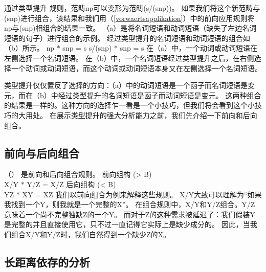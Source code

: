 通过类型提升
规则，范畴np可以变形为范畴(s/(s\bs np))。
如果我们将这个新范畴与(s\bs np)进行组合，该结果和我们用（\ref{vorwaertsapplikation}）中的前向应用规则将np与(s\bs np)相组合的结果一致。 
（a）是将名词短语和动词短语（缺失了左边名词短语的句子）进行组合的示例。
经过类型提升的名词短语和动词短语的组合如（b）所示。
\eal
\ex np $*$ s\bs np = s 
\ex s/(s\bs np) $*$ s\bs np = s
\zl
在（a）中，一个动词或动词短语在左侧选择一个名词短语。
在（b）中，一个名词短语经过类型提升之后，在右侧选择一个动词或动词短语，而这个动词或动词短语本身又在左侧选择一个名词短语。

类型提升仅仅置反了选择的方向：（a）中的动词短语是一个函子而名词短语是变元，而在（b）中经过类型提升的名词短语是函子而动词短语是变元。
这两种组合的结果是一样的。这种方向的选择乍一看是一个小技巧，但我们将会看到这个小技巧的大用处。
在展示类型提升的强大分析能力之前，我们先介绍一下前向和后向组合。 

\subsection{前向与后向组合}
\label{Kategorialgrammatik-Komposition}

（）
是前向和后向组合规则。
\eal
\ex\label{Regel-Vorwaertskomposition}
 前向组构
 (> B)\\
    X/Y $*$ Y/Z = X/Z 
\ex 后向组构
 (< B)\\
    Y\bs Z $*$ X\bs Y = X\bs Z
\zl 
我们以前向组合为例来解释这些规则。
X/Y大致可以理解为“如果我找到一个Y，则我就是一个完整的X”。
在组合规则中，X/Y和Y/Z组合。Y/Z意味着一个尚不完整独缺Z的一个Y。
而对于Z的这种需求被延迟了：我们假装Y是完整的并且直接使用它，只不过一直记得它实际上是缺少成分的。
因此，当我们组合X/Y和Y/Z时，我们自然得到一个缺少Z的X。 

\subsection{长距离依存的分析}
\label{Abschnitt-CG-UDC}

